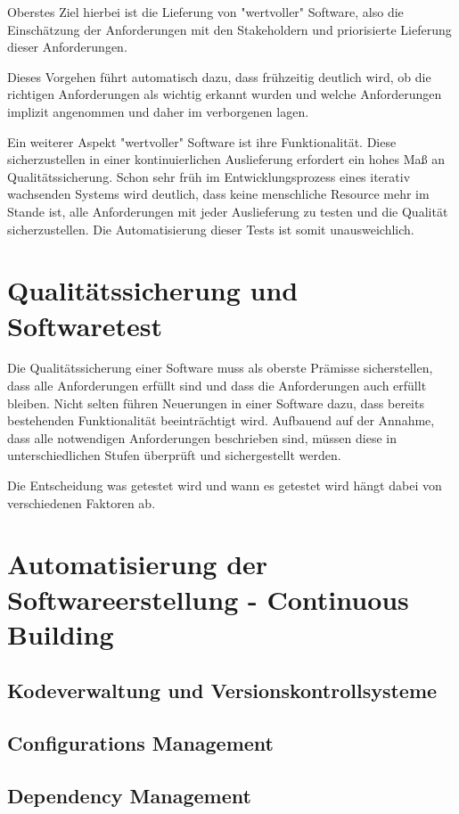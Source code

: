 \documentclass[10pt,a4paper]{book}
\begin{document}
Oberstes Ziel hierbei ist die Lieferung von "wertvoller" Software, also die Einschätzung der Anforderungen mit den Stakeholdern und priorisierte Lieferung dieser Anforderungen.

Dieses Vorgehen führt automatisch dazu, dass frühzeitig deutlich wird, ob die richtigen Anforderungen als wichtig erkannt wurden und welche Anforderungen implizit angenommen und daher im verborgenen lagen.

Ein weiterer Aspekt "wertvoller" Software ist ihre Funktionalität. Diese sicherzustellen in einer kontinuierlichen Auslieferung erfordert ein hohes Maß an Qualitätssicherung. Schon sehr früh im Entwicklungsprozess eines iterativ wachsenden Systems wird deutlich, dass keine menschliche Resource mehr im Stande ist, alle Anforderungen mit jeder Auslieferung zu testen und die Qualität sicherzustellen. Die Automatisierung dieser Tests ist somit unausweichlich.

\section{Qualitätssicherung und Softwaretest}

Die Qualitätssicherung einer Software muss als oberste Prämisse sicherstellen, dass alle Anforderungen erfüllt sind und dass die Anforderungen auch erfüllt bleiben. Nicht selten führen Neuerungen in einer Software dazu, dass bereits bestehenden Funktionalität beeinträchtigt wird. 
Aufbauend auf der Annahme, dass alle notwendigen Anforderungen beschrieben sind, müssen diese in unterschiedlichen Stufen überprüft und sichergestellt werden.

Die Entscheidung was getestet wird und wann es getestet wird hängt dabei von verschiedenen Faktoren ab.

\section{Automatisierung der Softwareerstellung - Continuous Building}

\subsection{Kodeverwaltung und Versionskontrollsysteme}
\subsection{Configurations Management}
\subsection{Dependency Management}
\end{document}
